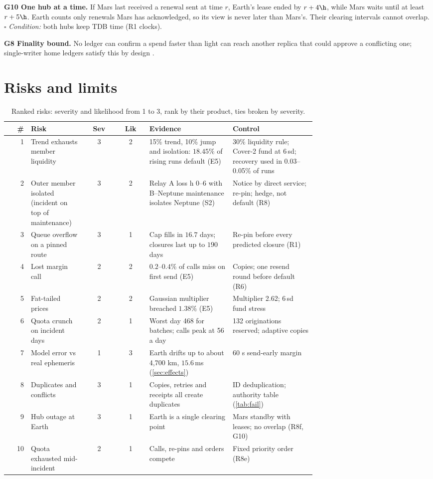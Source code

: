 \textbf{G10 One hub at a time.} If Mars last received a renewal sent at time $r$, Earth's lease ended by $r+4\h$, while Mars waits until at least $r+5\h$. Earth counts only renewals Mars has acknowledged, so its view is never later than Mars's. Their clearing intervals cannot overlap. $\square$ \emph{Condition:} both hubs keep TDB time (R1 clocks).

\textbf{G8 Finality bound.} No ledger can confirm a spend faster than light can reach another replica that could approve a conflicting one; single-writer home ledgers satisfy this by design \cite{gilbert2002}.

\section{Risks and limits}\label{sec:risk}
\begin{table}[H]
\centering
\caption{Ranked risks: severity and likelihood from 1 to 3, rank by their product, ties broken by severity.}\label{tab:risk}
\small
\begin{tabular}{@{}rp{0.18\linewidth}ccp{0.27\linewidth}p{0.27\linewidth}@{}}
\toprule
\# & Risk & Sev & Lik & Evidence & Control \\
\midrule
1 & Trend exhausts member liquidity & 3 & 2 & 15\% trend, 10\% jump and isolation: $18.45\%$ of rising runs default (E5) & 30\% liquidity rule; Cover-2 fund at 6\,sd; recovery used in 0.03--0.05\% of runs \\
2 & Outer member isolated (incident on top of maintenance) & 3 & 2 & Relay A loss h 0--6 with B--Neptune maintenance isolates Neptune (S2) & Notice by direct service; re-pin; hedge, not default (R8) \\
3 & Queue overflow on a pinned route & 3 & 1 & Cap fills in $16.7$ days; closures last up to $190$ days & Re-pin before every predicted closure (R1) \\
4 & Lost margin call & 2 & 2 & $0.2$--$0.4\%$ of calls miss on first send (E5) & Copies; one resend round before default (R6) \\
5 & Fat-tailed prices & 2 & 2 & Gaussian multiplier breached $1.38\%$ (E5) & Multiplier 2.62; 6\,sd fund stress \\
6 & Quota crunch on incident days & 2 & 1 & Worst day 468 for batches; calls peak at 56 a day & 132 originations reserved; adaptive copies \\
7 & Model error vs real ephemeris & 1 & 3 & Earth drifts up to about 4{,}700 km, $15.6$\,ms (\cref{sec:effects}) & 60 s send-early margin \\
8 & Duplicates and conflicts & 3 & 1 & Copies, retries and receipts all create duplicates & ID deduplication; authority table (\cref{tab:fail}) \\
9 & Hub outage at Earth & 3 & 1 & Earth is a single clearing point & Mars standby with leases; no overlap (R8f, G10) \\
10 & Quota exhausted mid-incident & 2 & 1 & Calls, re-pins and orders compete & Fixed priority order (R8e) \\
\bottomrule
\end{tabular}
\end{table}
